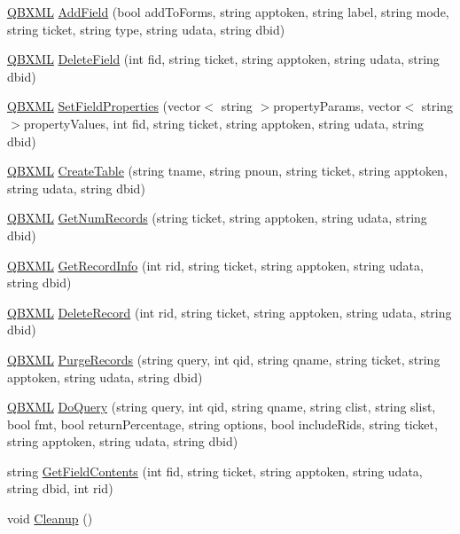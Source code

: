 \begin{DoxyCompactItemize}
\item 
\hyperlink{class_q_b_x_m_l}{Q\+B\+X\+M\+L} \hyperlink{class_q_b_wrapper_a411e4f414a4ff74801720da3502c4f33}{Add\+Field} (bool add\+To\+Forms, string apptoken, string label, string mode, string ticket, string type, string udata, string dbid)
\item 
\hyperlink{class_q_b_x_m_l}{Q\+B\+X\+M\+L} \hyperlink{class_q_b_wrapper_aa05817f83b2a60cc31bc5350399e1d89}{Delete\+Field} (int fid, string ticket, string apptoken, string udata, string dbid)
\item 
\hyperlink{class_q_b_x_m_l}{Q\+B\+X\+M\+L} \hyperlink{class_q_b_wrapper_adbdd00c2d8e49a47f4f04eed85240068}{Set\+Field\+Properties} (vector$<$ string $>$property\+Params, vector$<$ string $>$property\+Values, int fid, string ticket, string apptoken, string udata, string dbid)
\item 
\hyperlink{class_q_b_x_m_l}{Q\+B\+X\+M\+L} \hyperlink{class_q_b_wrapper_a2f113126a6be90cf7e6989d88fd552a4}{Create\+Table} (string tname, string pnoun, string ticket, string apptoken, string udata, string dbid)
\item 
\hyperlink{class_q_b_x_m_l}{Q\+B\+X\+M\+L} \hyperlink{class_q_b_wrapper_ae2683af81b7d67ed63ba488760506285}{Get\+Num\+Records} (string ticket, string apptoken, string udata, string dbid)
\item 
\hyperlink{class_q_b_x_m_l}{Q\+B\+X\+M\+L} \hyperlink{class_q_b_wrapper_a0489d9d624cc4bde429f20facc15d3d6}{Get\+Record\+Info} (int rid, string ticket, string apptoken, string udata, string dbid)
\item 
\hyperlink{class_q_b_x_m_l}{Q\+B\+X\+M\+L} \hyperlink{class_q_b_wrapper_affa5d7c3f1a19d0509d2a5c03e7b2c8f}{Delete\+Record} (int rid, string ticket, string apptoken, string udata, string dbid)
\item 
\hyperlink{class_q_b_x_m_l}{Q\+B\+X\+M\+L} \hyperlink{class_q_b_wrapper_a563d79fecd24b0ddae2be0a36c27e448}{Purge\+Records} (string query, int qid, string qname, string ticket, string apptoken, string udata, string dbid)
\item 
\hyperlink{class_q_b_x_m_l}{Q\+B\+X\+M\+L} \hyperlink{class_q_b_wrapper_ad75e2cd8fe5541a317e0b07e6a130aeb}{Do\+Query} (string query, int qid, string qname, string clist, string slist, bool fmt, bool return\+Percentage, string options, bool include\+Rids, string ticket, string apptoken, string udata, string dbid)
\item 
string \hyperlink{class_q_b_wrapper_a31b1f95cf4507b683a584bd9345f025d}{Get\+Field\+Contents} (int fid, string ticket, string apptoken, string udata, string dbid, int rid)
\item 
void \hyperlink{class_q_b_wrapper_a23f67ceee52901ab538998f9bfe3b167}{Cleanup} ()
\end{DoxyCompactItemize}


